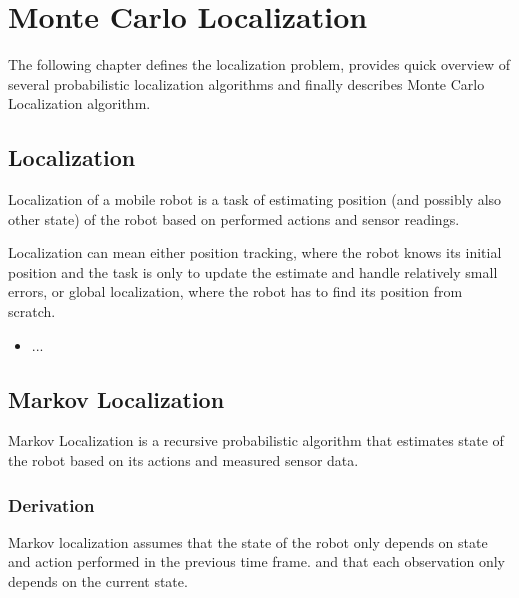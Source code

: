 \chapter{Monte Carlo Localization}
\label{chap:mcl}

The following chapter defines the localization problem, provides quick overview
of several probabilistic localization algorithms and finally describes
Monte Carlo Localization algorithm.

\section{Localization}
Localization of a mobile robot is a task of estimating position (and possibly
also other state) of the robot based on performed actions and sensor readings.

Localization can mean either position tracking, where the robot knows its initial
position and the task is only to update the estimate and handle relatively small
errors, or global localization, where the robot has to find its position from scratch.

\begin{itemize}
\item ...
\end{itemize}

\section{Markov Localization}

Markov Localization \cite{fox98,diard03} is a recursive probabilistic
algorithm that estimates state of the robot based on its actions and measured sensor data.

\subsection{Derivation}

Markov localization assumes that the state of the robot only depends
on state and action performed in the previous time frame.
and that each observation only depends on the current state.

